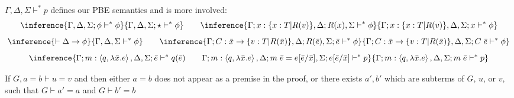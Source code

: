 $\Gamma, \Delta, \Sigma \vdash^* p$ defines our PBE semantics and is more involved:
\[
\inference
        {\Gamma, \Delta, \Sigma;\phi \vdash^* \phi}
        {\Gamma,\Delta,\Sigma;\star \vdash^* \phi}
        \qquad
\inference
      {\Gamma;x:\{x:T|R(v)\},\Delta;R(x),\Sigma \vdash^* \phi}
      {\Gamma;x:\{x:T|R(v)\},\Delta,\Sigma;x \vdash^* \phi}
\]
\[
\inference
        {\vdash \Delta \rightarrow \phi}
      {\Gamma,\Delta,\Sigma \vdash^* \phi}
      \qquad
\inference
      {\Gamma;C:\bar x \rightarrow \{v:T|R(\bar x)\},\Delta;R(\bar e),\Sigma;\bar e \vdash^* \phi}
       {\Gamma;C:\bar x \rightarrow \{v:T|R(\bar x)\},\Delta,\Sigma;C\;\bar e \vdash^* \phi}
\]
\[
\inference
        {\Gamma;m:\left<q,\lambda \bar x.e\right>,\Delta,\Sigma;\bar e \vdash^* q(\bar e) \qquad \Gamma;m:\left<q,\lambda \bar x.e\right>,\Delta;m\;\bar e = e[\bar e/\bar x], \Sigma;e[\bar e/\bar x]\vdash^* p}
           {\Gamma;m:\left<q,\lambda \bar x.e\right>,\Delta,\Sigma;m\; \bar e\vdash^* p}
\]
\begin{lemma}
  If $G,a=b\vdash u=v$ and then either $a=b$ does not appear as a premise in the proof, or
  there exists $a',b'$ which are subterms of $G$, $u$, or $v$, such that
  $G\vdash a'=a$ and $G\vdash b'=b$ \end{lemma}

